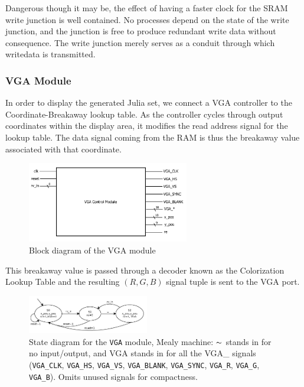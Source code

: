 \documentclass{article}
\begin{document}
Dangerous though it may be, the effect of having a faster clock for the SRAM write junction is well contained.
No processes depend on the state of the write junction, and the junction is free to produce redundant write data
without consequence. The write junction merely serves as a conduit through which writedata is transmitted.


\subsubsection{VGA Module}

In order to display the generated Julia set, we connect a VGA controller 
 to the Coordinate-Breakaway lookup table. As the controller cycles
through output coordinates within the display area, it modifies the
read address signal for the lookup table. The data signal coming from
the RAM is thus the breakaway value associated with that coordinate.

\begin{figure}[H]
  \centering
    \includegraphics[width=200pt]{block_diagrams/vga.pdf}
  \caption{Block diagram of the VGA module}
\end{figure}

This breakaway value is passed through a decoder known as the
Colorization Lookup Table and the resulting $(R, G, B)$ signal tuple
is sent to the VGA port.



\begin{figure}
  \centering
    \includegraphics[width=200px]{state_diagrams/vga.pdf}
  \caption{State diagram for the \texttt{VGA} module, Mealy machine: $\thicksim$
    stands in for no input/output, and VGA stands in for all the VGA\_
    signals (\texttt{VGA\_CLK}, \texttt{VGA\_HS}, \texttt{VGA\_VS},
    \texttt{VGA\_BLANK}, \texttt{VGA\_SYNC}, \texttt{VGA\_R}, \texttt{VGA\_G},
    \texttt{VGA\_B}). Omits unused signals for compactness.}
\end{figure}
\end{document}
